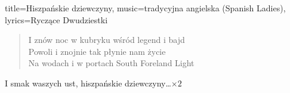 \begin{song}{title={Hiszpańskie dziewczyny}, music={tradycyjna angielska (Spanish Ladies)}, lyrics={Ryczące Dwudziestki}}
\begin{verse}
        I znów noc w kubryku wśród legend i bajd \\
        Powoli i znojnie tak płynie nam życie \\
        Na wodach i w portach South Foreland Light\footnotemark{}
    \end{verse}
    \begin{chorus}
        I smak waszych ust, hiszpańskie dziewczyny\ldots $\times 2$
    \end{chorus}
\end{song}

